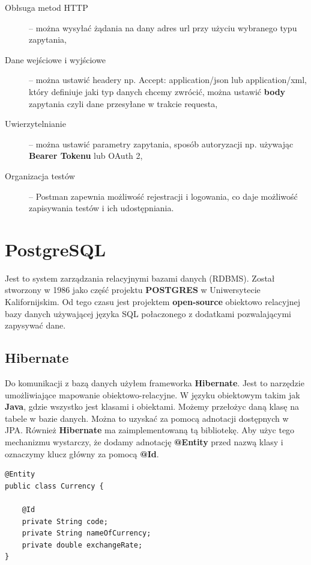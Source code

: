 \documentclass{iiuwb}
\begin{document}
\begin{description}
  \item[Obłsuga metod HTTP] -- można wysyłać żądania na dany adres url przy użyciu wybranego typu zapytania,
  \item[Dane wejściowe i wyjściowe] -- można ustawić headery np. Accept: application/json lub application/xml, który definiuje jaki typ danych chcemy zwrócić, można ustawić \textbf{body} zapytania czyli dane przesyłane w trakcie requesta,
  \item[Uwierzytelnianie] -- można ustawić parametry zapytania, sposób autoryzacji np. używając \textbf{Bearer Tokenu} lub OAuth 2,
  \item[Organizacja testów] -- Postman zapewnia możliwość rejestracji i logowania, co daje możliwość zapisywania testów i ich udostępniania.
\end{description}

\section{PostgreSQL}
\label{sec:PostgreSQL}

Jest to system zarządzania relacyjnymi bazami danych (RDBMS). Został stworzony w 1986 jako część projektu \textbf{POSTGRES} w Uniwersytecie Kalifornijskim. Od tego czasu jest projektem \textbf{open-source} obiektowo relacyjnej bazy danych używającej języka SQL połaczonego z dodatkami pozwalającymi zapysywać dane.

\subsection{Hibernate}
\label{sec:Hibernate}

Do komunikacji z bazą danych użyłem frameworka \textbf{Hibernate}. Jest to narzędzie umożliwiające mapowanie obiektowo-relacyjne. W języku obiektowym takim jak \textbf{Java}, gdzie wszystko jest klasami i obiektami. Możemy przełożyc daną klasę na tabele w bazie danych. Można to uzyskać za pomocą adnotacji dostępnych w JPA. Również \textbf{Hibernate} ma zaimplementowaną tą bibliotekę. Aby użyc  tego mechanizmu wystarczy, że dodamy adnotację \textbf{@Entity} przed nazwą klasy i oznaczymy klucz główny za pomocą \textbf{@Id}.\newline

\begin{lstlisting}[breaklines=true]
@Entity
public class Currency {

    @Id
    private String code;
    private String nameOfCurrency;
    private double exchangeRate;
}
\end{lstlisting}
\end{document}
